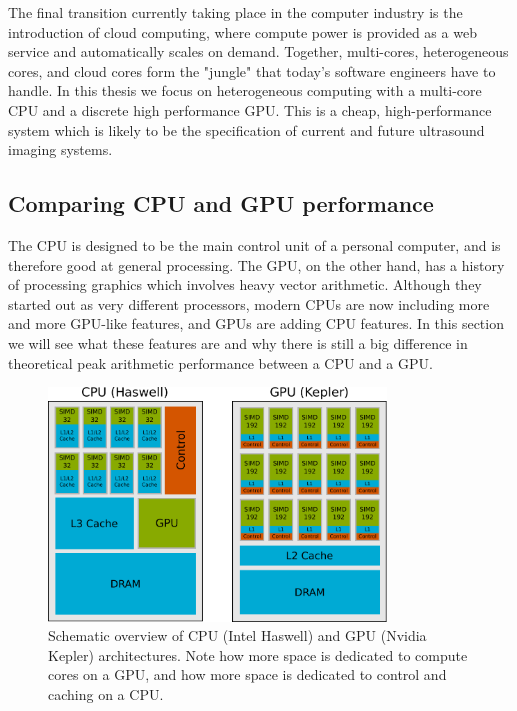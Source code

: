 The final transition currently taking place in the computer industry is the introduction of cloud computing, where compute power is provided as a web service and automatically scales on demand. Together, multi-cores, heterogeneous cores, and cloud cores form the "jungle" that today's software engineers have to handle. In this thesis we focus on heterogeneous computing with a multi-core CPU and a discrete high performance GPU. This is a cheap, high-performance system which is likely to be the specification of current and future ultrasound imaging systems.

\subsection{Comparing CPU and GPU performance}\label{sec:cpu_vs_gpu}
The CPU is designed to be the main control unit of a personal computer, and is therefore good at general processing. The GPU, on the other hand, has a history of processing graphics which involves heavy vector arithmetic. Although they started out as very different processors, modern CPUs are now including more and more GPU-like features, and GPUs are adding CPU features. In this section we will see what these features are and why there is still a big difference in theoretical peak arithmetic performance between a CPU and a GPU.

\begin{figure}
\centering
\includegraphics[width=0.8\textwidth]{img/CPU-GPU.pdf}
\caption{Schematic overview of CPU (Intel Haswell) and GPU (Nvidia Kepler) architectures. Note how more space is dedicated to compute cores on a GPU, and how more space is dedicated to control and caching on a CPU.}
\label{fig:cpu_gpu}
\end{figure}

